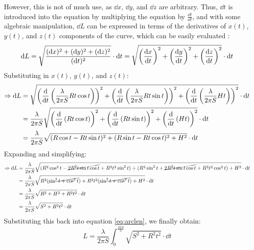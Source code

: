However, this is not of much use, as $\dd{x}$, $\dd{y}$, and $\dd{z}$ are arbitrary. Thus, $\dd{t}$ is introduced into the equation by multiplying the equation by $\frac{\dd{t}}{\dd{t}}$, and with some algebraic manipulation, $\dd{L}$ can be expressed in terms of the derivatives of $x(t)$, $y(t)$, and $z(t)$ components of the curve, which can be easily evaluated \autocite{schlickerArcLength}:
\begin{equation*}
    \dd{L} = \sqrt{\frac{(\dd{x})^2+(\dd{y})^2+(\dd{z})^2}{(\dd{t})^2}} \cdot \dd{t} = \sqrt{\left(\dv{x}{t}\right)^2+\left(\dv{y}{t}\right)^2+\left(\dv{z}{t}\right)^2} \cdot \dd{t}
\end{equation*}
\bulletarrow Substituting in $x(t)$, $y(t)$, and $z(t)$:
\begin{align*}
    \Rightarrow \dd{L} & = \sqrt{\left(\dv{t}\left(\frac{\lambda}{2\pi S}Rt\cos{t}\right)\right)^2+\left(\dv{t}\left(\frac{\lambda}{2\pi S}Rt\sin{t}\right)\right)^2+\left(\dv{t}\left(\frac{\lambda}{2\pi S}Ht\right)\right)^2} \cdot \dd{t} \\
           &= \frac{\lambda}{2\pi S}\sqrt{\left(\dv{t}\left(Rt\cos{t}\right)\right)^2+\left(\dv{t}\left(Rt\sin{t}\right)\right)^2+\left(\dv{t}\left(Ht\right)\right)^2} \cdot \dd{t} \\
           &= \frac{\lambda}{2\pi S}\sqrt{(R\cos{t}-Rt\sin{t})^2+(R\sin{t}-Rt\cos{t})^2+H^2} \cdot \dd{t}
\end{align*}
\bulletarrow Expanding and simplifying:
\begin{align}
    \Rightarrow \dd{L} &= \frac{\lambda}{2\pi S}\sqrt{(R^2\cos^2{t}-\cancel{2R^2t\sin{t}\cos{t}}+R^2t^2\sin^2{t})+(R^2\sin^2{t}+\cancel{2R^2t\sin{t}\cos{t}}+R^2t^2\cos^2{t})+H^2} \cdot \dd{t} \notag \\ 
     &= \frac{\lambda}{2\pi S}\sqrt{R^2(\cancel{\sin^2{t} + \cos^2{t}})+ R^2t^2(\cancel{\sin^2{t}+\cos^2{t}})+H^2} \cdot \dd{t} \notag \\ 
     &= \frac{\lambda}{2\pi S}\sqrt{R^2 +H^2 + R^2t^2} \cdot \dd{t} \notag \\ 
     &= \frac{\lambda}{2\pi S}\sqrt{S^2 + R^2t^2} \cdot \dd{t} 
\end{align}
\bulletarrow Substituting this back into equation \ref{eq:arclen}, we finally obtain:
\begin{equation}
    L = \frac{\lambda}{2\pi S}\int_0^\frac{2\pi S}{\lambda} \sqrt{S^2 + R^2t^2} \cdot \dd{t} \label{eq:integral}
\end{equation}

